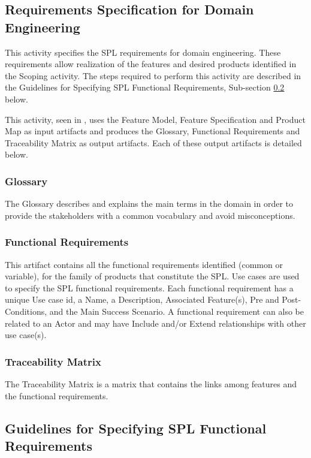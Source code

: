 \subsection{Requirements Specification for Domain Engineering}

This activity specifies the \ac{SPL} requirements for domain engineering. These requirements 
allow realization of the features and desired products identified in the Scoping activity. 
The steps required to perform this activity are described in the Guidelines for Specifying 
SPL Functional Requirements, Sub-section \ref{subsec:guidelines} below.

This activity, seen in , uses the Feature Model,
Feature Specification and Product Map as input artifacts and produces the Glossary, Functional Requirements and Traceability Matrix 
as output artifacts. Each of these output artifacts is detailed below.

\subsubsection{Glossary}

The Glossary describes and explains the main terms in the domain in order to
provide the stakeholders with a common vocabulary and avoid misconceptions.

\subsubsection{Functional Requirements}

This artifact contains all the functional requirements identified (common or
variable), for the family of products that constitute the \ac{SPL}. Use cases are used 
to specify the \ac{SPL} functional requirements. Each functional requirement has a unique 
Use case id, a Name, a Description, Associated Feature(s), Pre and Post-Conditions, and 
the Main Success Scenario. A functional requirement can also be related to an Actor and 
may have Include and/or Extend relationships with other use case(s).

\subsubsection{Traceability Matrix}

The Traceability Matrix is a matrix that contains the links among features and
the functional requirements.

\subsection{Guidelines for Specifying SPL Functional Requirements}
\label{subsec:guidelines}

